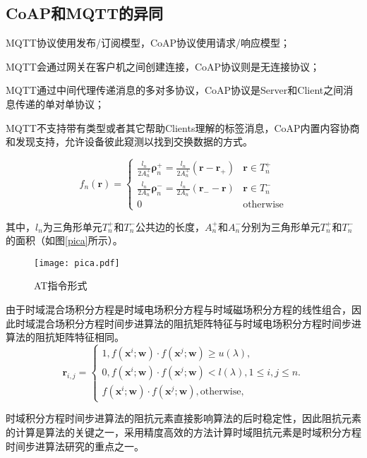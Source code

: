 \subsection{CoAP和MQTT的异同}


  MQTT协议使用发布/订阅模型，CoAP协议使用请求/响应模型；

  MQTT会通过网关在客户机之间创建连接，CoAP协议则是无连接协议；

  MQTT通过中间代理传递消息的多对多协议，CoAP协议是Server和Client之间消息传递的单对单协议；
  
  MQTT不支持带有类型或者其它帮助Clients理解的标签消息，CoAP内置内容协商和发现支持，允许设备彼此窥测以找到交换数据的方式。

\begin{equation}
f_n(\bm{r})=
\begin{cases}
\frac{l_n}{2A_n^+}\bm{\rho}_n^+=\frac{l_n}{2A_n^+}(\bm{r}-\bm{r}_+)&\bm{r}\in T_n^+\\
\frac{l_n}{2A_n^-}\bm{\rho}_n^-=\frac{l_n}{2A_n^-}(\bm{r}_--\bm{r})&\bm{r}\in T_n^-\\
0&\text{otherwise}
\end{cases}
\end{equation}

其中，$l_n$为三角形单元$T_n^+$和$T_n^-$公共边的长度，$A_n^+$和$A_n^-$分别为三角形单元$T_n^+$和$T_n^-$的面积（如图\ref{pica}所示）。

\begin{figure}[h]
	\texttt{[image: pica.pdf]}
	\caption{AT指令形式}
	\label{p}
\end{figure}

由于时域混合场积分方程是时域电场积分方程与时域磁场积分方程的线性组合，因此时域混合场积分方程时间步进算法的阻抗矩阵特征与时域电场积分方程时间步进算法的阻抗矩阵特征相同。
\begin{equation}
\label{latent_binary_variable}
\bm{r}_{i,j}=
\begin{cases}
1,f(\bm{x}^{i};\bm{w})\cdot f(\bm{x}^{j};\bm{w})\geq u(\lambda),\\
0,f(\bm{x}^{i};\bm{w})\cdot f(\bm{x}^{j};\bm{w})< l(\lambda), 1\leq i,j\leq n.\\
f(\bm{x}^{i};\bm{w})\cdot f(\bm{x}^{j};\bm{w}),\text{otherwise},
\end{cases}
\end{equation}

时域积分方程时间步进算法的阻抗元素直接影响算法的后时稳定性，因此阻抗元素的计算是算法的关键之一，采用精度高效的方法计算时域阻抗元素是时域积分方程时间步进算法研究的重点之一。


